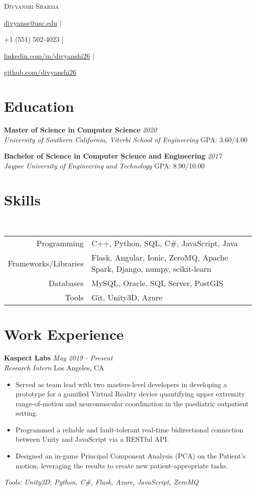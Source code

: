 \documentclass[letterpaper,10pt]{article}
\makeatletter
\newcommand{\organization}[4]{
    \vspace{1.5pt}
    \textbf{#1} \hfill{\emph{#2}} \\
    \emph{#3} \hfill{#4} \\
    \vspace{3pt}
}
\newcommand{\toolsused}[1]{
    \vspace{1.5pt}
    \emph{#1}\\
    \vspace{3pt}
}
\newcommand{\skills}[4]{
    \vspace{-2pt}
    \ \ \ \ \ \ \ \ \ \ \ 
    \begin{tabular}{r!{\color{burgundy}\vrule}l}
          Programming & #1 \\
          Frameworks/Libraries & #2 \\
          Databases & #3 \\
          Tools & #4
    \end{tabular}
    \vspace{4pt}
}
\newcommand{\bulletsBegin}{
    \vspace{1pt}
    \begin{minipage}{17.6cm}
    \begin{itemize}[leftmargin=0.6cm]
    \setlength\itemsep{-0.1em}
}
\newcommand{\bulletsEnd}{
    \end{itemize}\vspace{0pt}
    \end{minipage}
}
\newcommand{\myEmail}[1]{
    \href{mailto:divyanss@usc.edu}{#1} |
}
\newcommand{\myPhone}[1]{
    {#1} |
}
\newcommand{\mySite}[1]{
    \href{https://linkedin.com/in/divyanshi26}{#1} |
}
\newcommand{\myGitHub}[1]{
    \href{https://github.com/divyanshi26}{#1}
}
\newcommand{\myName}[5]{
    \begin{center}
        {\huge{\color{burgundy}\scshape{#1}}} \\
        \vspace{6pt}
        \myEmail{#2}
        \myPhone{#3}
        \mySite{#4}
        \myGitHub{#5}
    \end{center}
    \vspace{-4pt}
}
\makeatother
\begin{document}
    \myName{Divyanshi Sharma}{divyanss@usc.edu}{+1 (551) 502-4023}{linkedin.com/in/divyanshi26}{github.com/divyanshi26}

    \section{Education}
        
    \organization{Master of Science in Computer Science}{2020}
        {University of Southern California, Viterbi School of Engineering}{GPA: 3.60/4.00}

	\organization{Bachelor of Science in Computer Science and Engineering}{2017}
        {Jaypee University of Engineering and Technology}{GPA: 8.90/10.00}
        \vspace{5pt}
    
    
    \section{Skills}
    
    \skills
        {C++, Python, SQL, C\#, JavaScript, Java}  %
        {Flask, Angular, Ionic, ZeroMQ, Apache Spark, Django, numpy, scikit-learn}  %
        {MySQL, Oracle, SQL Server, PostGIS}  %
        {Git, Unity3D, Azure}  %


    \section{Work Experience}

        \organization{Kaspect Labs}{May 2019 - Present}
        {Research Intern}{Los Angeles, CA}
        \bulletsBegin
            \item Served as team lead with two masters-level developers in developing a prototype for a gamified Virtual Reality device quantifying upper extremity range-of-motion and neuromuscular coordination in the paediatric outpatient setting.
            \vspace{-1pt}
            \item Programmed a reliable and fault-tolerant real-time bidirectional connection between Unity and JavaScript via a RESTful API.
            \vspace{-2pt}
            \item Designed an in-game Principal Component Analysis (PCA) on the Patient’s motion, leveraging the results to create new patient-appropriate tasks.
        \bulletsEnd
        \vspace{-8pt}
        \toolsused{Tools: Unity3D, Python, C\#, Flask, Azure, JavaScript, ZeroMQ}
        
\end{document}
